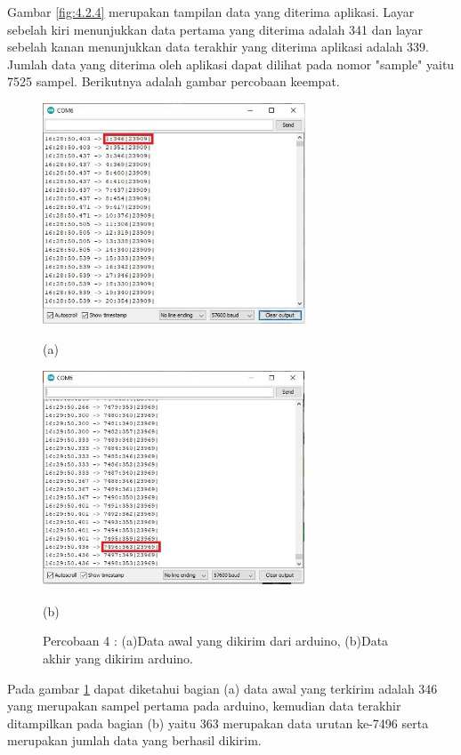 Gambar \ref{fig:4.2.4} merupakan tampilan data yang diterima aplikasi. Layar sebelah kiri menunjukkan data pertama yang diterima adalah 341 dan layar sebelah kanan menunjukkan data terakhir yang diterima aplikasi adalah 339. Jumlah data yang diterima oleh aplikasi dapat dilihat pada nomor "sample" yaitu 7525 sampel. Berikutnya adalah gambar percobaan keempat. 
\begin{figure}[H] \centering
	\includegraphics[width=0.7\textwidth]{img/percob/Slide7}
	
	(a)
	
	\includegraphics[width=0.7\textwidth]{img/percob/Slide8}
	
	(b)
	
	\caption{Percobaan 4 : (a)Data awal yang dikirim dari arduino, (b)Data akhir yang dikirim arduino.}
	\label{fig:4.2.5}
\end{figure}
\vspace{1ex}
Pada gambar \ref{fig:4.2.5} dapat diketahui bagian (a) data awal yang terkirim adalah 346 yang merupakan sampel pertama pada arduino, kemudian data terakhir ditampilkan pada bagian (b) yaitu 363 merupakan data urutan ke-7496 serta merupakan jumlah data yang berhasil dikirim.


